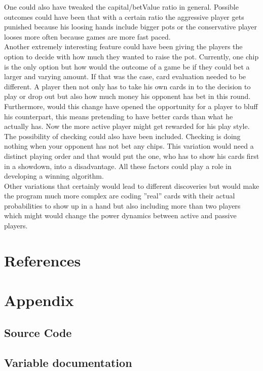 \documentclass[11pt]{article}
\begin{document}
One could also have tweaked the capital/betValue ratio in general. Possible outcomes could have been that with a certain ratio the aggressive player gets punished because his loosing hands include bigger pots or the conservative player looses more often because games are more fast paced.\\

Another extremely interesting feature could have been giving the players the option to decide with how much they wanted to raise the pot. Currently, one chip is the only option but how would the outcome of a game be if they could bet a larger and varying amount. If that was the case, card evaluation needed to be different. A player then not only has to take his own cards in to the decision to play or drop out but also how much money his opponent has bet in this round. Furthermore, would this change have opened the opportunity for a player to bluff his counterpart, this means pretending to have better cards than what he actually has. Now the more active player might get rewarded for his play style.\\

The possibility of checking could also have been included. Checking is doing nothing when your opponent has not bet any chips. This variation would need a distinct playing order and that would put the  one, who has to show his cards first in a showdown, into a disadvantage. All these factors could play a role in developing a winning algorithm.\\

Other variations that certainly would lead to different discoveries but would make the program much more complex are coding ''real'' cards with their actual probabilities to show up in a hand but also including more than two players which might would change the power dynamics between active and passive players.


\section{References}

\section{Appendix}
\subsection{Source Code}
\subsection{Variable documentation}
\end{document}
